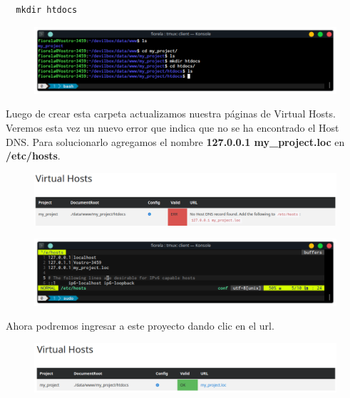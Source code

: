 \documentclass{article}
\begin{document}
\begin{verbatim}
  mkdir htdocs
\end{verbatim}

\begin{figure}[h!]
  \centering
  \includegraphics[scale=0.65]{./Pictures/Devilbox/023_htdocs.png}
\end{figure}

Luego de crear esta carpeta actualizamos nuestra páginas de Virtual Hosts.
Veremos esta vez un nuevo error que indica que no se ha encontrado el Host DNS.
Para solucionarlo agregamos el nombre \textbf{127.0.0.1 my\_project.loc} en
\textbf{/etc/hosts}.\\

\begin{figure}[h!]
  \centering
  \includegraphics[scale=0.5]{./Pictures/Devilbox/024_virtual_hosts.png}
\end{figure}

\begin{figure}[h!]
  \centering
  \includegraphics[scale=0.75]{./Pictures/Devilbox/025_hosts.png}
\end{figure}

Ahora podremos ingresar a este proyecto dando clic en el url.

\begin{figure}[h!]
  \centering
  \includegraphics[scale=0.65]{./Pictures/Devilbox/026_virtual_hosts.png}
\end{figure}
\end{document}
